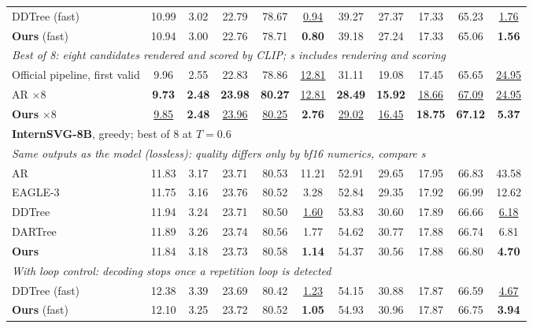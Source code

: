 \begin{table}[t]
\begin{tabular*}{\textwidth}{@{\extracolsep{\fill}}l*{10}{c}@{}}
DDTree (fast) & 10.99 & 3.02 & 22.79 & 78.67 & \underline{0.94} & 39.27 & 27.37 & 17.33 & 65.23 & \underline{1.76} \\
\textbf{Ours} (fast) & 10.94 & 3.00 & 22.76 & 78.71 & \textbf{0.80} & 39.18 & 27.24 & 17.33 & 65.06 & \textbf{1.56} \\
\multicolumn{11}{l}{\hspace{0.6em}\textit{Best of 8: eight candidates rendered and scored by CLIP; s includes rendering and scoring}} \\
Official pipeline, first valid & 9.96 & 2.55 & 22.83 & 78.86 & \underline{12.81} & 31.11 & 19.08 & 17.45 & 65.65 & \underline{24.95} \\
AR $\times$8 & \textbf{9.73} & \textbf{2.48} & \textbf{23.98} & \textbf{80.27} & \underline{12.81} & \textbf{28.49} & \textbf{15.92} & \underline{18.66} & \underline{67.09} & \underline{24.95} \\
\textbf{Ours} $\times$8 & \underline{9.85} & \textbf{2.48} & \underline{23.96} & \underline{80.25} & \textbf{2.76} & \underline{29.02} & \underline{16.45} & \textbf{18.75} & \textbf{67.12} & \textbf{5.37} \\
\midrule
\multicolumn{11}{l}{\textbf{InternSVG-8B}, greedy; best of 8 at $T{=}0.6$} \\
\multicolumn{11}{l}{\hspace{0.6em}\textit{Same outputs as the model (lossless): quality differs only by bf16 numerics, compare s}} \\
AR & 11.83 & 3.17 & 23.71 & 80.53 & 11.21 & 52.91 & 29.65 & 17.95 & 66.83 & 43.58 \\
EAGLE-3 & 11.75 & 3.16 & 23.76 & 80.52 & 3.28 & 52.84 & 29.35 & 17.92 & 66.99 & 12.62 \\
DDTree & 11.94 & 3.24 & 23.71 & 80.50 & \underline{1.60} & 53.83 & 30.60 & 17.89 & 66.66 & \underline{6.18} \\
DARTree & 11.89 & 3.26 & 23.74 & 80.56 & 1.77 & 54.62 & 30.77 & 17.88 & 66.74 & 6.81 \\
\textbf{Ours} & 11.84 & 3.18 & 23.73 & 80.58 & \textbf{1.14} & 54.37 & 30.56 & 17.88 & 66.80 & \textbf{4.70} \\
\multicolumn{11}{l}{\hspace{0.6em}\textit{With loop control: decoding stops once a repetition loop is detected}} \\
DDTree (fast) & 12.38 & 3.39 & 23.69 & 80.42 & \underline{1.23} & 54.15 & 30.88 & 17.87 & 66.59 & \underline{4.67} \\
\textbf{Ours} (fast) & 12.10 & 3.25 & 23.72 & 80.52 & \textbf{1.05} & 54.93 & 30.96 & 17.87 & 66.75 & \textbf{3.94} \\

\end{tabular*}
\end{table}
